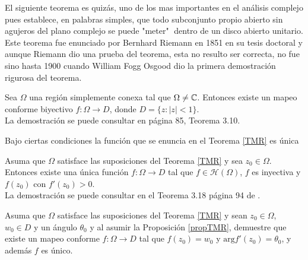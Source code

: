 El siguiente teorema es quizás, uno de los mas importantes en el análisis complejo pues establece, en palabras simples, que  todo subconjunto propio abierto sin agujeros del plano complejo se puede "meter" $\;$dentro de un disco abierto unitario. Este teorema fue enunciado  por Bernhard Riemann en 1851 en su tesis doctoral y aunque Riemann dio una prueba del teorema, esta no resulto ser correcta, no fue sino hasta 1900 cuando William Fogg Osgood dio la primera demostración rigurosa del teorema.

\begin{teor}\label{TMR}
	Sea $\Omega$ una región simplemente conexa tal que $\Omega\neq \mathbb{C}$. Entonces existe un mapeo conforme biyectivo $f: \Omega\rightarrow D$, donde $D =\{ z : |z| < 1 \}$.\\
	La demostración se puede consultar en \cite{tarlok} página 85, Teorema 3.10.
\end{teor}
Bajo ciertas condiciones la función que se enuncia en el Teorema \ref{TMR} es única
\begin{prop}\label{propTMR}
 Asuma que $\Omega$ satisface las suposiciones del Teorema \ref{TMR} y sea $z_0\in \Omega$. Entonces existe una única función $f:\Omega\rightarrow D$ tal que  $f\in \mathcal{H}(\Omega)$, $f$ es inyectiva y $f(z_0)$ con $f'(z_0)>0$.\\
 La demostración se puede consultar en el Teorema 3.18 página 94 de \cite{tarlok}.
\end{prop}

\begin{coro}\label{coroRiemman}
	 Asuma que $\Omega$ satisface las suposiciones del Teorema \ref{TMR} y sean $z_0\in \Omega$, $w_0\in D$ y un ángulo $\theta_0$ y al asumir la Proposición \ref{propTMR}, demuestre que existe un mapeo conforme $f:\Omega\rightarrow D$ tal que $f(z_0)=w_0$ y $\mbox{arg}f'(z_0)=\theta_0$, y además $f$ es único.
\end{coro}

